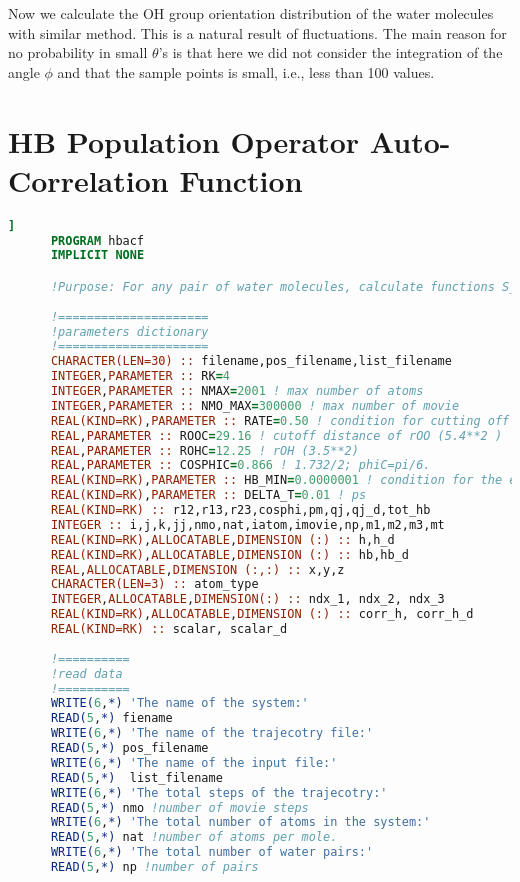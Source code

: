 Now we calculate the OH group orientation distribution of the water molecules with similar method.
This is a natural result of fluctuations. The main reason for no probability in small $\theta$'s is
that here we did not consider the integration of the angle $\phi$ and that the sample points is small, i.e., less than 100 values.

\section{HB Population Operator Auto-Correlation Function}
\begin{lstlisting}[language=fortran]                  ]
      PROGRAM hbacf
      IMPLICIT NONE 

      !Purpose: For any pair of water molecules, calculate functions S_HB(t), S_d_HB(t), C_HB(t) and C_d_HB(t)
      
      !=====================
      !parameters dictionary
      !=====================
      CHARACTER(LEN=30) :: filename,pos_filename,list_filename 
      INTEGER,PARAMETER :: RK=4              
      INTEGER,PARAMETER :: NMAX=2001 ! max number of atoms
      INTEGER,PARAMETER :: NMO_MAX=300000 ! max number of movie
      REAL(KIND=RK),PARAMETER :: RATE=0.50 ! condition for cutting off auto-correlation functions
      REAL,PARAMETER :: ROOC=29.16 ! cutoff distance of rOO (5.4**2 )
      REAL,PARAMETER :: ROHC=12.25 ! rOH (3.5**2)
      REAL,PARAMETER :: COSPHIC=0.866 ! 1.732/2; phiC=pi/6.
      REAL(KIND=RK),PARAMETER :: HB_MIN=0.0000001 ! condition for the existence of h-bond
      REAL(KIND=RK),PARAMETER :: DELTA_T=0.01 ! ps
      REAL(KIND=RK) :: r12,r13,r23,cosphi,pm,qj,qj_d,tot_hb
      INTEGER :: i,j,k,jj,nmo,nat,iatom,imovie,np,m1,m2,m3,mt 
      REAL(KIND=RK),ALLOCATABLE,DIMENSION (:) :: h,h_d
      REAL(KIND=RK),ALLOCATABLE,DIMENSION (:) :: hb,hb_d
      REAL,ALLOCATABLE,DIMENSION (:,:) :: x,y,z
      CHARACTER(LEN=3) :: atom_type  
      INTEGER,ALLOCATABLE,DIMENSION(:) :: ndx_1, ndx_2, ndx_3
      REAL(KIND=RK),ALLOCATABLE,DIMENSION (:) :: corr_h, corr_h_d
      REAL(KIND=RK) :: scalar, scalar_d 
      
      !==========
      !read data
      !==========
      WRITE(6,*) 'The name of the system:'
      READ(5,*) fiename
      WRITE(6,*) 'The name of the trajecotry file:'
      READ(5,*) pos_filename     
      WRITE(6,*) 'The name of the input file:'
      READ(5,*)  list_filename    
      WRITE(6,*) 'The total steps of the trajecotry:'
      READ(5,*) nmo !number of movie steps
      WRITE(6,*) 'The total number of atoms in the system:'
      READ(5,*) nat !number of atoms per mole.
      WRITE(6,*) 'The total number of water pairs:'
      READ(5,*) np !number of pairs   


\end{lstlisting}
